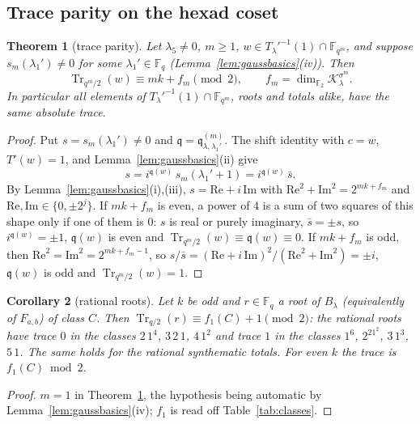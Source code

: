 \documentclass[12pt,a4paper]{amsart}
\newtheorem{theorem}{Theorem}[section]
\newtheorem{corollary}[theorem]{Corollary}
\theoremstyle{definition}
\newcommand{\F}{\mathbb{F}}
\newcommand{\Tr}{\operatorname{Tr}}
\newcommand{\Kk}{\mathcal{K}}
\newcommand{\qq}{\mathfrak{q}}
\begin{document}
\subsection{Trace parity on the hexad coset}
\begin{theorem}[trace parity]\label{thm:traceparity}
Let $\lambda_5\ne0$, $m\ge1$, $w\in T_\lambda'^{-1}(1)\cap\F_{q^m}$, and suppose $s_m(\lambda_1')\ne0$ for some $\lambda_1'\in\F_q$ (Lemma~\ref{lem:gaussbasics}(iv)). Then
\[
\Tr_{q^m/2}(w)\equiv mk+f_m\pmod 2,\qquad f_m=\dim_{\F_2}\Kk_\lambda^{\sigma^m}.
\]
In particular all elements of $T_\lambda'^{-1}(1)\cap\F_{q^m}$, roots and totals alike, have the same absolute trace.
\end{theorem}
\begin{proof}
Put $s=s_m(\lambda_1')\ne0$ and $\qq=\qq^{(m)}_{\lambda,\lambda_1'}$. The shift identity with $c=w$, $T'(w)=1$, and Lemma~\ref{lem:gaussbasics}(ii) give
\[
s=i^{\qq(w)}\,s_m(\lambda_1'+1)=i^{\qq(w)}\,\bar s .
\]
By Lemma~\ref{lem:gaussbasics}(i),(iii), $s=\mathrm{Re}+i\,\mathrm{Im}$ with $\mathrm{Re}^2+\mathrm{Im}^2=2^{mk+f_m}$ and $\mathrm{Re},\mathrm{Im}\in\{0,\pm2^j\}$. If $mk+f_m$ is even, a power of $4$ is a sum of two squares of this shape only if one of them is $0$: $s$ is real or purely imaginary, $\bar s=\pm s$, so $i^{\qq(w)}=\pm1$, $\qq(w)$ is even and $\Tr_{q^m/2}(w)\equiv\qq(w)\equiv0$. If $mk+f_m$ is odd, then $\mathrm{Re}^2=\mathrm{Im}^2=2^{mk+f_m-1}$, so $s/\bar s=(\mathrm{Re}+i\,\mathrm{Im})^2/(\mathrm{Re}^2+\mathrm{Im}^2)=\pm i$, $\qq(w)$ is odd and $\Tr_{q^m/2}(w)=1$.
\end{proof}

\begin{corollary}[rational roots]\label{cor:rationalroots}
Let $k$ be odd and $r\in\F_q$ a root of $B_\lambda$ (equivalently of $F_{a,b}$) of class $C$. Then $\Tr_{q/2}(r)\equiv f_1(C)+1\pmod2$: the rational roots have trace $0$ in the classes $2\,1^4$, $3\,2\,1$, $4\,1^2$ and trace $1$ in the classes $1^6$, $2^21^2$, $3\,1^3$, $5\,1$. The same holds for the rational synthematic totals. For even $k$ the trace is $f_1(C)\bmod2$.
\end{corollary}
\begin{proof}
$m=1$ in Theorem~\ref{thm:traceparity}, the hypothesis being automatic by Lemma~\ref{lem:gaussbasics}(iv); $f_1$ is read off Table~\ref{tab:classes}.
\end{proof}
\end{document}
